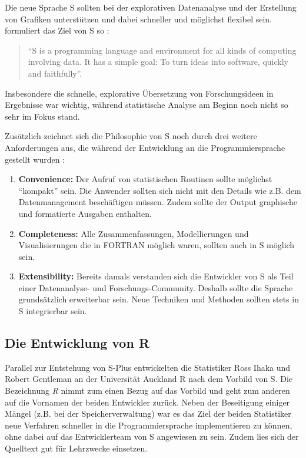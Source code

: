 \documentclass[
]{book}
\begin{document}
Die neue Sprache S sollten bei der explorativen Datenanalyse und der Erstellung von Grafiken unterstützen
und dabei schneller und möglichst flexibel sein.
\citet{Chambers_2000} formuliert das Ziel von S so :

\begin{quote}
``S is a programming language and environment for all kinds of computing involving data. It has a simple goal: To turn ideas into software, quickly and faithfully''.
\end{quote}

Insbesondere die schnelle, explorative Übersetzung von Forschungsideen in Ergebnisse war wichtig, während statistische Analyse am Beginn noch nicht so sehr im Fokus stand.

Zusätzlich zeichnet sich die Philosophie von S noch durch drei weitere Anforderungen aus, die
während der Entwicklung an die Programmiersprache gestellt wurden \citep[S. 84:5]{Chambers_2020}:

\begin{enumerate}
\def\labelenumi{\arabic{enumi}.}
\item
  \textbf{Convenience:} Der Aufruf von statistischen Routinen sollte möglichst ``kompakt'' sein. Die Anwender sollten sich nicht mit den Details wie z.B. dem Datenmanagement beschäftigen müssen. Zudem sollte der Output graphische und formatierte Ausgaben enthalten.
\item
  \textbf{Completeness:} Alle Zusammenfassungen, Modellierungen und Visualisierungen die in FORTRAN möglich waren, sollten auch in S möglich sein.
\item
  \textbf{Extensibility:} Bereits damals verstanden sich die Entwickler von S als Teil einer Datenanalyse- und
  Forschungs-Community.
  Deshalb sollte die Sprache grundsätzlich erweiterbar sein. Neue Techniken und Methoden sollten stets in S integrierbar sein.
\end{enumerate}

\hypertarget{die-entwicklung-von-r}{%
\subsection{Die Entwicklung von R}\label{die-entwicklung-von-r}}

Parallel zur Entstehung von S-Plus entwickelten die Statistiker Ross Ihaka und Robert Gentleman
an der Universität Auckland R nach dem Vorbild von S. Die Bezeichnung \emph{R} nimmt zum einen Bezug auf das Vorbild und geht zum anderen auf die Vornamen der beiden Entwickler zurück.
Neben der Beseitigung einiger Mängel (z.B. bei der Speicherverwaltung) war es das Ziel der beiden Statistiker neue Verfahren schneller in die Programmiersprache implementieren zu können, ohne dabei auf das Entwicklerteam von S angewiesen zu sein.
Zudem lies sich der Quelltext gut für Lehrzwecke einsetzen.
\end{document}
